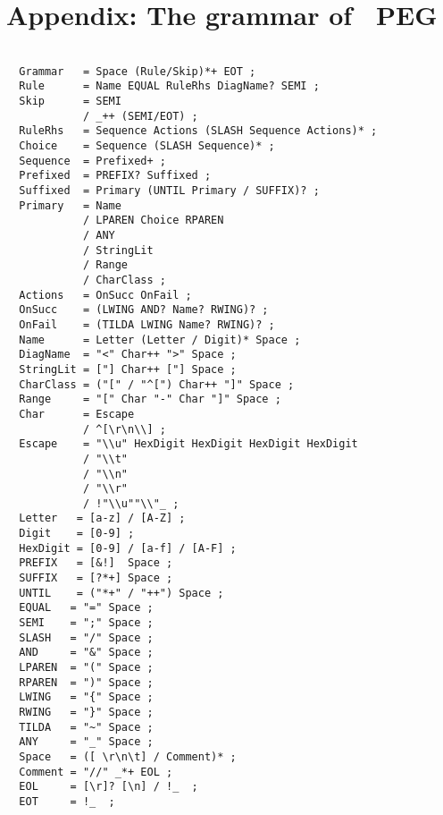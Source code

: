 \newpage

\section{Appendix: The grammar of \Mouse\ PEG}


\small 
\begin{Verbatim}[frame=single,framesep=2mm,samepage=true,xleftmargin=15mm,xrightmargin=15mm,baselinestretch=0.8]

  Grammar   = Space (Rule/Skip)*+ EOT ;
  Rule      = Name EQUAL RuleRhs DiagName? SEMI ;
  Skip      = SEMI
            / _++ (SEMI/EOT) ;
  RuleRhs   = Sequence Actions (SLASH Sequence Actions)* ;
  Choice    = Sequence (SLASH Sequence)* ;
  Sequence  = Prefixed+ ;
  Prefixed  = PREFIX? Suffixed ;
  Suffixed  = Primary (UNTIL Primary / SUFFIX)? ;
  Primary   = Name
            / LPAREN Choice RPAREN
            / ANY
            / StringLit
            / Range
            / CharClass ;
  Actions   = OnSucc OnFail ;
  OnSucc    = (LWING AND? Name? RWING)? ;
  OnFail    = (TILDA LWING Name? RWING)? ;
  Name      = Letter (Letter / Digit)* Space ;
  DiagName  = "<" Char++ ">" Space ;
  StringLit = ["] Char++ ["] Space ;
  CharClass = ("[" / "^[") Char++ "]" Space ;
  Range     = "[" Char "-" Char "]" Space ;
  Char      = Escape
            / ^[\r\n\\] ;
  Escape    = "\\u" HexDigit HexDigit HexDigit HexDigit
            / "\\t" 
            / "\\n"
            / "\\r"
            / !"\\u""\\"_ ;
  Letter   = [a-z] / [A-Z] ;
  Digit    = [0-9] ;
  HexDigit = [0-9] / [a-f] / [A-F] ;
  PREFIX   = [&!]  Space ;
  SUFFIX   = [?*+] Space ;
  UNTIL    = ("*+" / "++") Space ;
  EQUAL   = "=" Space ;
  SEMI    = ";" Space ;
  SLASH   = "/" Space ;
  AND     = "&" Space ;
  LPAREN  = "(" Space ;
  RPAREN  = ")" Space ;
  LWING   = "{" Space ;
  RWING   = "}" Space ;
  TILDA   = "~" Space ;
  ANY     = "_" Space ;
  Space   = ([ \r\n\t] / Comment)* ;
  Comment = "//" _*+ EOL ;
  EOL     = [\r]? [\n] / !_  ;
  EOT     = !_  ;

\end{Verbatim}
\normalsize

